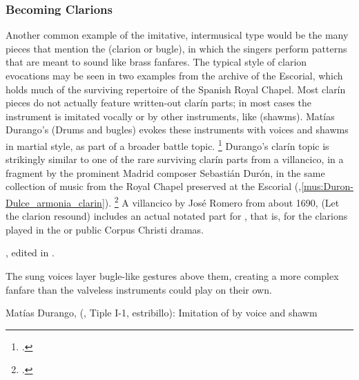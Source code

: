 \subsubsection{Becoming Clarions}

Another common example of the imitative, intermusical type would be the many
pieces that mention the  (clarion or bugle), in which the
singers perform patterns that are meant to sound like brass fanfares.
The typical style of clarion evocations may be seen in two examples from the
archive of the Escorial, which holds much of the surviving repertoire of the
Spanish Royal Chapel.
Most clarín pieces do not actually feature written-out clarín parts; in most
cases the instrument is imitated vocally or by other instruments, like
 (shawms).
Matías Durango's  (Drums and bugles) evokes these
instruments with voices and shawms in martial style, as part of a broader
battle topic.%
    \footnote{.}
Durango's clarín topic is strikingly similar to one of the rare surviving
clarín parts from a villancico, in a fragment by the prominent Madrid composer
Sebastián Durón, in the same collection of music from the Royal Chapel
preserved at the Escorial
(,\ref{mus:Duron-Dulce_armonia_clarin}).%
    \footnote{.}
A villancico by José Romero from about 1690,  (Let the
clarion resound) includes an actual notated part for , that is, for the clarions played in the 
or public Corpus Christi dramas.%
\begin{Footnote} 
    , edited in \autocite[655--661]{CaberoPueyo:PhD}.
\end{Footnote}
The sung voices layer bugle-like gestures above them, creating a more complex
fanfare than the valveless instruments could play on their own.


{Matías Durango,  (, Tiple I-1,
estribillo): Imitation of  by voice and shawm}


